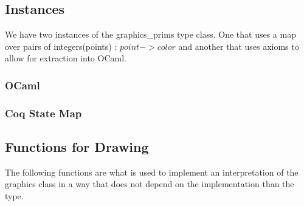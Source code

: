 \documentclass{llncs}
\begin{document}
\subsection{Instances}
We have two instances of the graphics\_prims type class.  One that uses a map over pairs of integers(points) : $point -> color$ and another that
uses axioms to allow for extraction into OCaml.

  \subsubsection{OCaml}
  \subsubsection{Coq State Map}



  



\subsection{Functions for Drawing}
The following functions are what is used to implement an interpretation of the graphics class in a way that does not depend on the implementation than the type.
\end{document}
